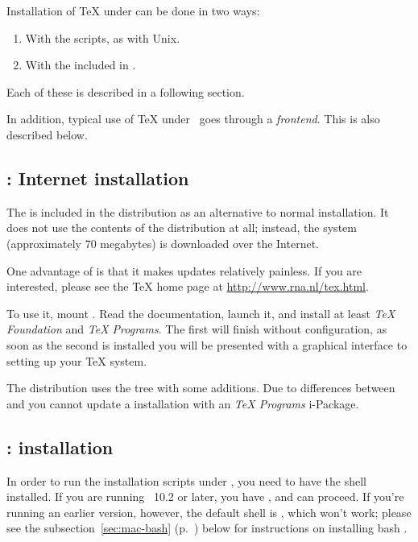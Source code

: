 \documentclass{article}
\begin{document}
Installation of \TeX{} under \MacOSX{} can be done in two ways:

\begin{enumerate}
\item With the  scripts, as with Unix.
\item With the  included in
.
\end{enumerate}

\noindent Each of these is described in a following section.

In addition, typical use of \TeX{} under \MacOSX\ goes through a
\emph{frontend}.  This is also described below.


\subsection{\protect{}: Internet installation}
\label{sec:i-Installer}

The  is included in the \TeXLive{} distribution as
an alternative to normal installation.  It does not use the contents of
the \TeXLive{} distribution at all; instead, the system (approximately
70 megabytes) is downloaded over the Internet.

One advantage of  is that it makes updates
relatively painless.  If you are interested, please see the
 \TeX{} home page at \url{http://www.rna.nl/tex.html}.

To use it, mount .  Read the documentation,
launch it, and install at least \emph{TeX Foundation} and \emph{TeX
Programs}. The first will finish without configuration, as soon as the
second is installed you will be presented with a graphical interface to
setting up your \TeX{} system.

The  distribution uses the \teTeX{} 
tree with some additions. Due to differences between \TeXLive{} and
\teTeX{} you cannot update a \TeXLive{} installation with an
 \emph{TeX Programs} i-Package.


\subsection{\protect{}: \protect\TeXLive{} installation}

In order to run the installation scripts under \MacOSX, you need to have
the  shell installed.  If you are running \MacOSX~10.2
or later, you have , and can proceed.  If you're running
an earlier \MacOSX{} version, however, the default shell is
, which won't work; please see the
subsection~\ref{sec:mac-bash} (p.~\pageref{sec:mac-bash}) below for
instructions on installing bash .
\end{document}
